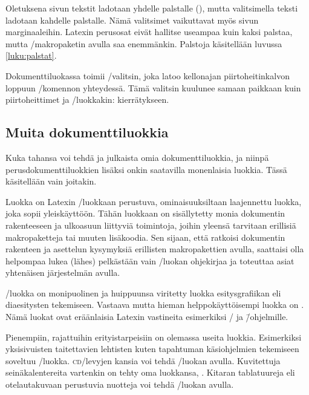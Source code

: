 Oletuksena%
 sivun tekstit ladotaan yhdelle
palstalle (), mutta valitsimella 
teksti ladotaan kahdelle palstalle. Nämä valitsimet vaikuttavat myös
sivun marginaaleihin. Latexin perusosat eivät hallitse useampaa kuin
kaksi palstaa, mutta \-/makropaketin avulla saa
enemmänkin. Palstoja käsitellään luvussa \ref{luku:palstat}.

Dokumenttiluokassa%
  toimii \-/valitsin, joka
latoo kellon\-ajan piirtoheitinkalvon loppuun \-/komennon yhteydessä. Tämä valitsin kuulunee samaan paikkaan
kuin piirtoheittimet ja \-/luokkakin: kierrätykseen.

\subsection{Muita dokumenttiluokkia}

Kuka tahansa voi tehdä ja julkaista omia dokumenttiluokkia, ja niinpä
perusdokumenttiluokkien lisäksi onkin saatavilla monenlaisia luokkia.
Tässä käsitellään vain joitakin.

Luokka  on Latexin \-/luokkaan perustuva,
ominaisuuksiltaan laajennettu luokka, joka sopii yleiskäyttöön. Tähän
luokkaan on sisällytetty monia dokumentin rakenteeseen ja ulkoasuun
liittyviä toimintoja, joihin yleensä tarvitaan erillisiä makropaketteja
tai muuten lisäkoodia. Sen sijaan, että ratkoisi dokumentin rakenteen ja
asettelun kysymyksiä erillisten makropakettien avulla, saattaisi olla
helpompaa lukea (lähes) pelkästään vain \-/luokan
ohjekirjaa ja toteuttaa asiat yhtenäisen järjestelmän avulla.

\-/luokka on monipuolinen ja huippuunsa viritetty luokka
esi\-tys\-gra\-fii\-kan eli dia\-esi\-tys\-ten tekemiseen. Vastaava
mutta hieman helppokäyttöisempi luokka on . Nämä
luokat ovat eräänlaisia Latexin vastineita esimerkiksi
\-/{} ja 
\=/ohjelmille.

Pienempiin, rajattuihin erityistarpeisiin on olemassa useita luokkia.
Esimerkiksi yksisivuisten taitettavien lehtisten kuten tapahtuman
käsi\-ohjel\-mien tekemiseen soveltuu \-/luokka.
\textsc{cd}\-/levyjen kansia voi tehdä \-/luokan avulla.
Kuvitettuja seinäkalentereita vartenkin on tehty oma luokkansa,
. Kitaran tablatuureja eli otelautakuvaan
perustuvia nuotteja voi tehdä \-/luokan avulla.


